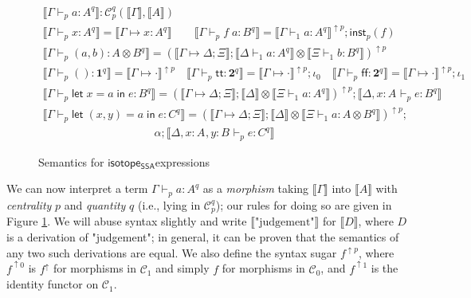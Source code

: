 \documentclass[acmsmall,screen,review]{acmart}
\newcommand{\mc}[1]{\ensuremath{\mathcal{#1}}}
\newcommand{\mb}[1]{\ensuremath{\mathbf{#1}}}
\newcommand{\ms}[1]{\ensuremath{\mathsf{#1}}}
\newcommand{\lbl}[1]{{`#1}}
\newcommand{\ctt}{\ms{tt}}
\newcommand{\cff}{\ms{ff}}
\newcommand{\letexpr}[3]{\ensuremath{\ms{let}\;#1 = #2\;\ms{in}\;#3}}
\newcommand{\csplits}[3]{#1 \mapsto #2;#3}
\newcommand{\cwk}[2]{#1 \mapsto #2}
\newcommand{\thyp}[3]{#1: {#2}^{#3}}
\newcommand{\lhyp}[3]{#1[#2](#3)}
\newcommand{\llhyp}[3]{\lhyp{\lbl{#1}}{#2}{#3}}
\newcommand{\hasty}[5]{#1 \vdash_{#2} #3: {#4}^{#5}}
\newcommand{\haslb}[3]{#1 \vdash #2 \rhd #3}
\newcommand{\dnt}[1]{\llbracket{#1}\rrbracket}
\newcommand{\upg}[2]{{#1}^{\uparrow #2}}
\newcommand{\isotopessa}{\ms{isotope_{SSA}}}
\begin{document}
\begin{figure}
  \begin{gather*}
    \boxed{\dnt{\hasty{\Gamma}{p}{a}{A}{q}}
      : \mc{C}_p^q(\dnt{\Gamma}, \dnt{A})} 
      \\
    \dnt{\hasty{\Gamma}{p}{x}{A}{q}} 
      = \dnt{\cwk{\Gamma}{\thyp{x}{A}{q}}}
      \qquad
    \dnt{\hasty{\Gamma}{p}{f\;a}{B}{q}}
      = \upg{\dnt{\hasty{\Gamma}{1}{a}{A}{q}}}{p}
      ; \ms{inst}_p(f) 
      \\
    \dnt{\hasty{\Gamma}{p}{(a, b)}{A \otimes B}{q}}
      = \upg{(
        \dnt{\csplits{\Gamma}{\Delta}{\Xi}};
        \dnt{\hasty{\Delta}{1}{a}{A}{q}} \otimes
        \dnt{\hasty{\Xi}{1}{b}{B}{q}}
      )}{p} 
      \\
    \dnt{\hasty{\Gamma}{p}{()}{\mb{1}}{q}}
      = \upg{\dnt{\cwk{\Gamma}{\cdot}}}{p} 
      \quad
    \dnt{\hasty{\Gamma}{p}{\ctt}{\mb{2}}{q}}
      = \upg{\dnt{\cwk{\Gamma}{\cdot}}}{p};\iota_0
      \quad
    \dnt{\hasty{\Gamma}{p}{\cff}{\mb{2}}{q}}
      = \upg{\dnt{\cwk{\Gamma}{\cdot}}}{p};\iota_1 
      \\
    \dnt{\hasty{\Gamma}{p}{\letexpr{x}{a}{e}}{B}{q}}
      = \upg{(
        \dnt{\csplits{\Gamma}{\Delta}{\Xi}}
        ; \dnt{\Delta} \otimes \dnt{\hasty{\Xi}{1}{a}{A}{q}}
      )}{p};\dnt{\hasty{\Delta, \thyp{x}{A}{}}{p}{e}{B}{q}} 
      \\
    \dnt{\hasty{\Gamma}{p}{\letexpr{(x, y)}{a}{e}}{C}{q}}
      = \upg{(
        \dnt{\csplits{\Gamma}{\Delta}{\Xi}}
        ; \dnt{\Delta} \otimes \dnt{\hasty{\Xi}{1}{a}{A \otimes B}{q}}
      )}{p}
      ; 
      \\ \qquad \qquad \qquad \qquad \qquad \alpha
      ; \dnt{\hasty{\Delta, \thyp{x}{A}{}, \thyp{y}{B}{}}{p}{e}{C}{q}}
  \end{gather*}
  \caption{Semantics for \isotopessa expressions}
  \label{fig:ssa-term-semantics}
\end{figure}

We can now interpret a term \(\hasty{\Gamma}{p}{a}{A}{q}\) as a
\textit{morphism} taking \(\dnt{\Gamma}\) into \(\dnt{A}\) with
\textit{centrality} \(p\) and \textit{quantity} \(q\) (i.e., lying in
\(\mc{C}_p^q\)); our rules for doing so are given in Figure
\ref{fig:ssa-term-semantics}. We will abuse syntax slightly and write
\(\dnt{\text{"judgement"}}\) for \(\dnt{D}\), where \(D\) is a derivation of
"judgement"; in general, it can be proven that the semantics of any two such
derivations are equal. We also define the syntax sugar \(\upg{f}{p}\), where
\(\upg{f}{0}\) is \(\upg{f}{}\) for morphisms in \(\mc{C}_1\) and simply \(f\)
for morphisms in \(\mc{C}_0\), and \(\upg{f}{1}\) is the identity functor on
\(\mc{C}_1\).
\end{document}
